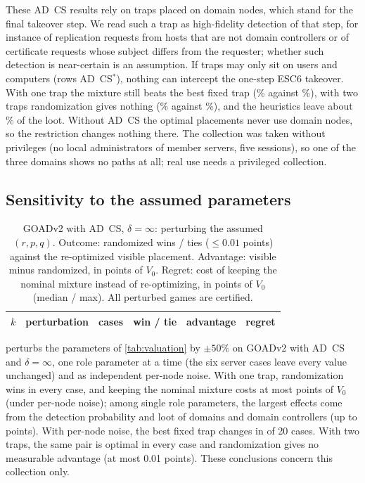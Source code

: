 \documentclass[runningheads]{llncs}
\begin{document}
These AD~CS results rely on traps placed on domain nodes, which stand for the final takeover step. We read such a trap as high-fidelity detection of that step, for instance of replication requests from hosts that are not domain controllers or of certificate requests whose subject differs from the requester; whether such detection is near-certain is an assumption. If traps may only sit on users and computers (rows AD~CS$^\ast$), nothing can intercept the one-step ESC6 takeover. With one trap the mixture still beats the best fixed trap (\GoadNdMixOne\% against \GoadNdVisOne\%), with two traps randomization gives nothing (\GoadNdMixTwo\% against \GoadNdVisTwo\%), and the heuristics leave about \GoadNdHeurTwo\% of the loot. Without AD~CS the optimal placements never use domain nodes, so the restriction changes nothing there. The collection was taken without privileges (no local administrators of member servers, five sessions), so one of the three domains shows no paths at all; real use needs a privileged collection.

\subsection{Sensitivity to the assumed parameters}\label{sec:sensitivity}

\begin{table}[t]
\centering
\caption{GOADv2 with AD~CS, $\delta=\infty$: perturbing the assumed $(r,p,q)$. Outcome: randomized wins / ties ($\le0.01$ points) against the re-optimized visible placement. Advantage: visible minus randomized, in points of $V_0$. Regret: cost of keeping the nominal mixture instead of re-optimizing, in points of $V_0$ (median / max). All \SensCount{} perturbed games are certified.}\label{tab:sens}
\small\setlength{\tabcolsep}{3pt}
\begin{tabular}{rlrrrr}
\toprule
$k$ & perturbation & cases & win / tie & advantage & regret\\
\midrule
\end{tabular}
\end{table}

 perturbs the parameters of \cref{tab:valuation} by $\pm50\%$ on GOADv2 with AD~CS and $\delta=\infty$, one role parameter at a time (the six server cases leave every value unchanged) and as independent per-node noise. With one trap, randomization wins in every case, and keeping the nominal mixture costs at most \SensRegretMaxOne{} points of $V_0$ (under per-node noise); among single role parameters, the largest effects come from the detection probability and loot of domains and domain controllers (up to \SensRegretMaxRoleOne{} points). With per-node noise, the best fixed trap changes in \SensVisChange{} of 20 cases. With two traps, the same pair is optimal in every case and randomization gives no measurable advantage (at most 0.01 points). These conclusions concern this collection only.
\end{document}
